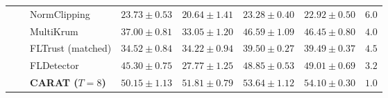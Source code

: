\begin{table}[!htbp]
{\begin{tabular}{c c l c c c c c}
& & NormClipping & $23.73 \pm 0.53$ & $20.64 \pm 1.41$ & $23.28 \pm 0.40$ & $22.92 \pm 0.50$ & $6.0$ \\
& & MultiKrum & $37.00 \pm 0.81$ & $33.05 \pm 1.20$ & $46.59 \pm 1.09$ & $46.45 \pm 0.80$ & $4.0$ \\
& & FLTrust (matched) & $34.52 \pm 0.84$ & $34.22 \pm 0.94$ & $39.50 \pm 0.27$ & $39.49 \pm 0.37$ & $4.5$ \\
& & FLDetector & $45.30 \pm 0.75$ & $27.77 \pm 1.25$ & $48.85 \pm 0.53$ & $49.01 \pm 0.69$ & $3.2$ \\
\rowcolor{caratrow}
& & \textbf{CARAT ($T=8$)} & \textbf{$50.15 \pm 1.13$} & \textbf{$51.81 \pm 0.79$} & \textbf{$53.64 \pm 1.12$} & \textbf{$54.10 \pm 0.30$} & \textbf{$1.0$} \\
\bottomrule
\end{tabular}
}
\end{table}
